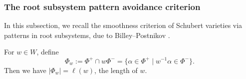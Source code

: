 \documentclass[11pt, reqno]{amsart}
\renewcommand{\subset}{\subseteq}
\newtheorem{prop}[Thm]{Proposition}
\newtheorem{lem}[Thm]{Lemma}
\theoremstyle{definition}
\numberwithin{equation}{section}
\begin{document}
\subsubsection{The root subsystem pattern avoidance criterion}
In this subsection, we recall the smoothness criterion of Schubert varieties via patterns in root subsystems,   due to Billey--Postnikov \cite{BP-05}.




 



For $w\in W$, define
\[
    \Phi_w:=\Phi^+\cap w\Phi^-=\{\alpha \in \Phi^+\mid w^{-1}\alpha  \in \Phi^-\}.
\]
 Then we have $|\Phi_w|=\ell(w)$, the length of $w$. 



  



 

\end{document}
